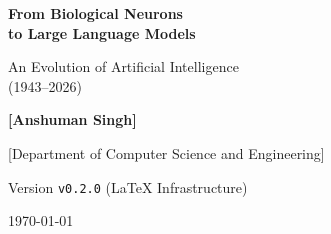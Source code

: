 \begin{titlepage}
    \centering
    \vspace*{2cm}
    
    {\Huge \bfseries From Biological Neurons \\[0.3cm]
    to Large Language Models}
    
    \vspace{0.5cm}
    {\Large An Evolution of Artificial Intelligence \\[0.2cm]
    (1943–2026)}
    
    \vspace{2cm}
    
    {\large \textbf{[Anshuman Singh]}}
    
    \vspace{0.5cm}
    {\large [Department of Computer Science and Engineering]}
    
    \vspace{2cm}
    
    \vfill
    
    {\large Version \texttt{v0.2.0} (LaTeX Infrastructure)}
    
    \vspace{0.3cm}
    {\large \today}
    
\end{titlepage}
